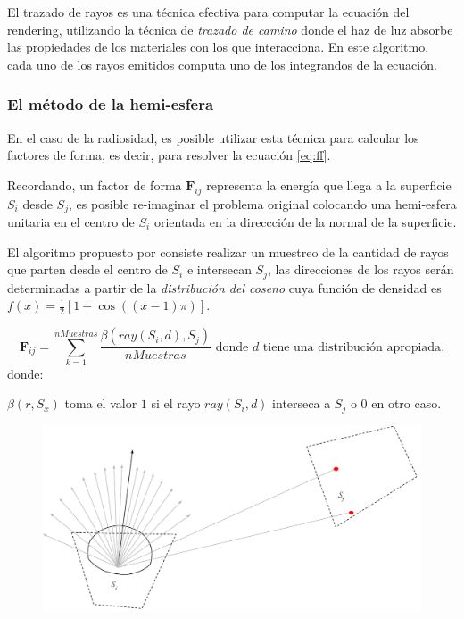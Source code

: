 El trazado de rayos es una técnica efectiva \cite{Kajiya} para computar la ecuación del rendering, utilizando la técnica de \textit{trazado de camino} donde el haz de luz absorbe las propiedades de los materiales con los que interacciona. En este algoritmo, cada uno de los rayos emitidos computa uno de los integrandos de la ecuación.

\subsubsection{El método de la hemi-esfera}

En el caso de la radiosidad, es posible utilizar esta técnica para calcular los factores de forma, es decir, para resolver la ecuación \eqref{eq:ff}.

Recordando, un factor de forma $\mathbf{F}_{ij}$ representa la energía que llega a la superficie $S_{i}$ desde $S_{j}$, es posible re-imaginar el problema original colocando una hemi-esfera unitaria en el centro de $S_{i}$ orientada en la direccción de la normal de la superficie.

El algoritmo propuesto por \citeauthor{Malley}  consiste realizar un muestreo de la cantidad de  rayos que parten desde el centro de $S_{i}$ e intersecan $S_{j}$, las direcciones de los rayos serán determinadas a partir de la \textit{distribución del coseno} cuya función de densidad es $f(x) = \frac{1}{2}[1 + \cos((x-1)\pi)]$.

\begin{equation}
	\mathbf{F}_{ij} = \sum_{k=1}^{nMuestras} \frac{\beta(ray(S_{i},d), S_{j})}{nMuestras} \text{ donde } d \text{ tiene una distribución apropiada}.
	\label{eq:ffhemiesfera}
\end{equation}
donde:

$\beta(r, S_{x})$ toma el valor $1$ si el rayo $ray(S_{i},d)$ interseca a $S_{j}$ o $0$ en otro caso.

\vspace{5mm}
\begin{figure}[H]
	\centering
	\includegraphics[width=\linewidth]{assets/Raytracing}
	\label{img:ff}
\end{figure}

